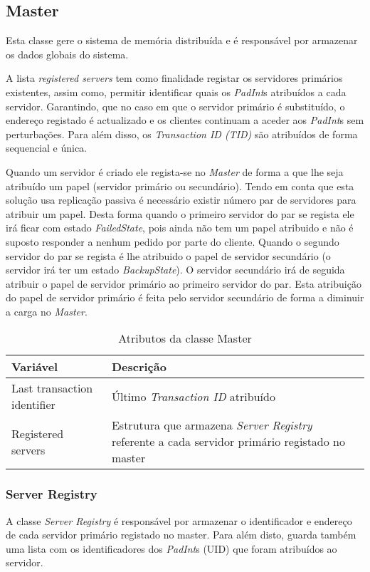 \subsection{Master}

Esta classe gere o sistema de memória distribuída e é responsável por armazenar os dados globais do sistema.

A lista \textit{registered servers} tem como finalidade registar os servidores primários existentes, assim como, permitir identificar quais os \textit{PadInt}s atribuídos a cada servidor. Garantindo, que no caso em que o servidor primário é substituído, o endereço registado é actualizado e os clientes continuam a aceder aos \textit{PadInt}s sem perturbações. Para além disso, os \textit{Transaction ID (TID)} são atribuídos de forma sequencial e única.

Quando um servidor é criado ele regista-se no \textit{Master} de forma a que lhe seja atribuído um papel (servidor primário ou secundário). Tendo em conta que esta solução usa replicação passiva é necessário existir número par de servidores para atribuir um papel. Desta forma quando o primeiro servidor do par se regista ele irá ficar com estado \textit{FailedState}, pois ainda não tem um papel atribuido e não é suposto responder a nenhum pedido por parte do cliente. Quando o segundo servidor do par se regista é lhe atribuido o papel de servidor secundário (o servidor irá ter um estado \textit{BackupState}). O servidor secundário irá de seguida atribuir o papel de servidor primário ao primeiro servidor do par. Esta atribuição do papel de servidor primário é feita pelo servidor secundário de forma a diminuir a carga no \textit{Master}.

\begin{table}[H]
\centering
\begin{tabular}{| p{2cm} | p{5cm} |}
\hline
\textbf{Variável} & \textbf{Descrição} \\
\hline
Last transaction
identifier & Último \textit{Transaction ID} atribuído \\
\hline
Registered
servers & Estrutura que armazena \textit{ Server Registry} referente a cada servidor primário registado no master \\
\hline
\end{tabular}
\caption{Atributos da classe Master}
\end{table}


\subsubsection{Server Registry}
A classe \textit{Server Registry} é responsável por armazenar o identificador e endereço de cada servidor primário registado no master. Para além disto, guarda também uma lista com os identificadores dos \textit{PadInt}s  (UID) que foram atribuídos ao servidor.

